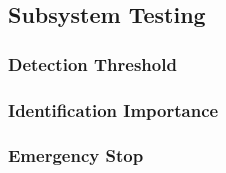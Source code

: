 \subsection{Subsystem Testing}

\subsubsection{Detection Threshold}


\subsubsection{Identification Importance}


\subsubsection{Emergency Stop}


